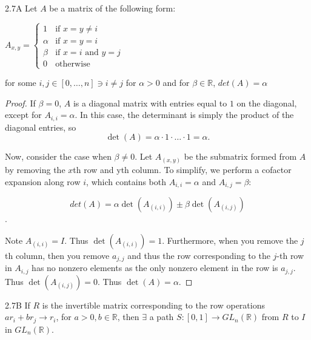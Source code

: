 \documentclass{article}
\newcommand{\R}{\mathbb{R}}
\begin{document}
\begin{claim}{2.7A}\label{Claim 2.7A.}
    Let $A$ be a matrix of the following form: 
    
    $A_{x, y} = \begin{cases}
        1 & \text{if } x = y \neq i \\
        \alpha & \text{if } x = y = i \\
        \beta & \text{if } x = i \text{ and } y = j \\
        0 & \text{otherwise}  
    \end{cases}$
    
    for some $i, j \in [0, \dots, n] \ni i \neq j$ for $\alpha > 0$ and for $\beta \in \R$, $det(A) = \alpha$      
\end{claim}
\begin{proof}
    If \( \beta = 0 \), \( A \) is a diagonal matrix with entries equal to \( 1 \) on the diagonal, except for \( A_{i, i} = \alpha \). In this case, the determinant is simply the product of the diagonal entries, so
\[\det(A) = \alpha \cdot 1 \cdot \dots \cdot 1 = \alpha.\]

    Now, consider the case when \( \beta \neq 0 \).
    Let $A_{(x, y)}$ be the submatrix formed from $A$ by removing the $x$th row and yth column.    
    To simplify, we perform a cofactor expansion along row \( i \), which contains both \( A_{i, i} = \alpha \) and \( A_{i, j} = \beta \):

    \[det(A) = \alpha \det(A_{(i, i)}) \pm \beta \det(A_{(i, j)})\]. 

    Note $A_{(i, i)} = I$. Thus $\det(A_{(i, i)}) = 1$. Furthermore, when you remove the $j$th column, then you remove $a_{j, j}$ and thus the row corresponding to the $j$-th row in $A_{i, j}$ has no nonzero elements as the only nonzero element in the row is $a_{j , j}$. Thus $\det(A_{(i, j)}) = 0$. Thus $\det(A) = \alpha$.            

    
    
\end{proof}
\begin{claim}{2.7B}\label{Claim 2.7B.}
    If $R$ is the invertible matrix corresponding to the row operations $a r_i + b r_j \to r_i$, for $a > 0, b \in \R$, then $\exists$ a path $S: [0, 1] \to GL_n(\R)$ from $R$ to $I$ in $GL_n(\R)$.        
\end{claim}
\end{document}
